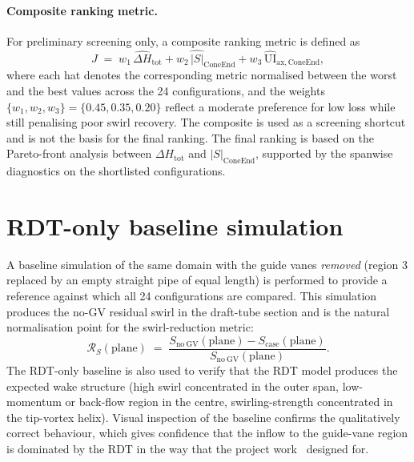 \paragraph{Composite ranking metric.}
For preliminary screening only, a composite ranking metric is defined as
\begin{equation}
J \;=\; w_1\,\widehat{\Delta H}_{\mathrm{tot}} + w_2\,\widehat{|S|}_{\mathrm{ConeEnd}} + w_3\,\widehat{\mathrm{UI}}_{\mathrm{ax,ConeEnd}},
\label{eq:composite}
\end{equation}
where each hat denotes the corresponding metric normalised between the worst and the best values across the 24 configurations, and the weights $\{w_1, w_2, w_3\} = \{0.45, 0.35, 0.20\}$ reflect a moderate preference for low loss while still penalising poor swirl recovery. The composite is used as a screening shortcut and is not the basis for the final ranking. The final ranking is based on the Pareto-front analysis between $\Delta H_{\mathrm{tot}}$ and $|S|_{\mathrm{ConeEnd}}$, supported by the spanwise diagnostics on the shortlisted configurations.
 
\section{RDT-only baseline simulation}
\label{sec:methods_rdt_baseline}
 
A baseline simulation of the same domain with the guide vanes \emph{removed} (region 3 replaced by an empty straight pipe of equal length) is performed to provide a reference against which all 24 configurations are compared. This simulation produces the no-GV residual swirl in the draft-tube section and is the natural normalisation point for the swirl-reduction metric:
\begin{equation}
\mathcal{R}_S(\mathrm{plane}) \;=\; \frac{S_{\mathrm{no\ GV}}(\mathrm{plane}) - S_{\mathrm{case}}(\mathrm{plane})}{S_{\mathrm{no\ GV}}(\mathrm{plane})}.
\label{eq:swirl_reduction}
\end{equation}
The RDT-only baseline is also used to verify that the RDT model produces the expected wake structure (high swirl concentrated in the outer span, low-momentum or back-flow region in the centre, swirling-strength concentrated in the tip-vortex helix). Visual inspection of the baseline confirms the qualitatively correct behaviour, which gives confidence that the inflow to the guide-vane region is dominated by the RDT in the way that the project work~\cite{Leonsen2025} designed for.
 
